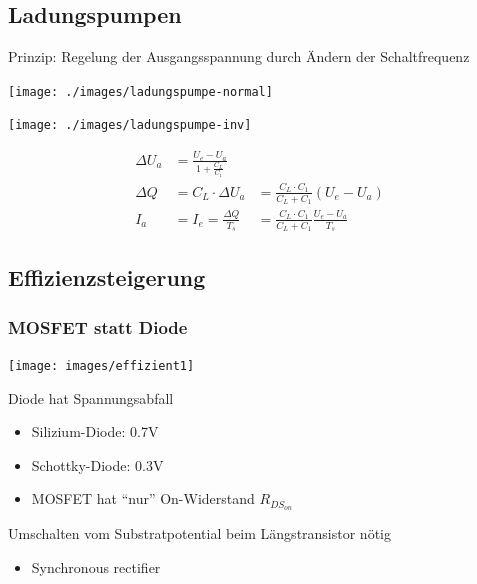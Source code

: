 \subsection{Ladungspumpen}
	Prinzip: Regelung der Ausgangsspannung durch Ändern der Schaltfrequenz \\
	\begin{minipage}{5cm}
		\texttt{[image: ./images/ladungspumpe-normal]}
	\end{minipage}
	\begin{minipage}{5cm}
		\texttt{[image: ./images/ladungspumpe-inv]}
	\end{minipage}
	\begin{minipage}{6cm}
		\begin{align*}
			\Delta U_a &= \frac{U_e - U_a}{1 + \frac{C_L}{C_1}} \\
			\Delta Q &= C_L \cdot \Delta U_a &= \frac{C_L \cdot C_1}{C_L + C_1} (U_e - U_a) \\
			I_a &= I_e = \frac{\Delta Q}{T_s} &= \frac{C_L \cdot C_1}{C_L + C_1} \frac{U_e - U_a}{T_s}
		\end{align*}
	\end{minipage}
	
\subsection{Effizienzsteigerung}
	\subsubsection{MOSFET statt Diode}
		\texttt{[image: images/effizient1]}
		\begin{itemize}
		\begin{minipage}{8cm}
 		 	\item Diode hat Spannungsabfall
  			\begin{itemize}
    			\item Silizium-Diode: 0.7V
   				\item Schottky-Diode: 0.3V
    			\item MOSFET hat "`nur"' On-Widerstand $R_{DS_{on}}$
			\end{itemize}
		\end{minipage}
		\begin{minipage}{8cm}
			\item Umschalten vom Substratpotential beim Längstransistor nötig
   			\begin{itemize}
     			\item Synchronous rectifier
    		\end{itemize}
		\end{minipage}
		\end{itemize}